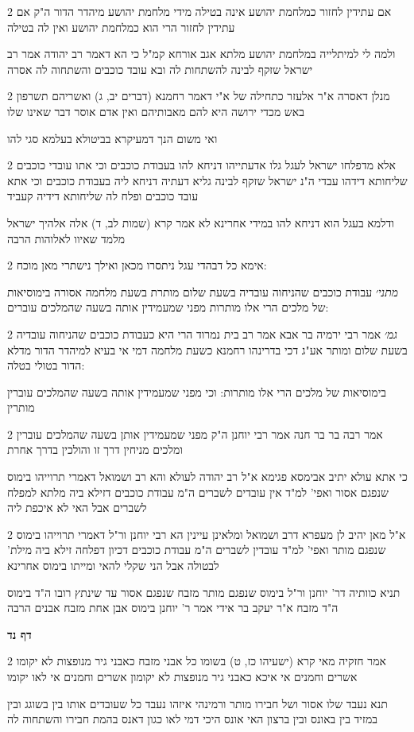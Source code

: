 \documentclass[12pt, openany]{book}
\newcommand{\sethebfont}{
\fontsize{10.5pt}{21.0pt} \selectfont
}
\newcommand{\twocol}[1]{
	{\sethebfont \begin{multicols}{2}
			#1
	\end{multicols}}	
}
\newcommand{\sectname}{}
\newcommand{\newsection}[1]{
	\addcontentsline{toc}{section}{#1}
	\renewcommand{\sectname}{#1}	
	\vspace{-\baselineskip}
	\begin{center}
		\textbf{%
\fontsize{16pt}{16pt}\selectfont
			#1}
	\end{center}
	\vspace{-\baselineskip}
	\nopagebreak
}
\begin{document}
\twocol{אם עתידין לחזור כמלחמת יהושע אינה בטילה מידי מלחמת יהושע מיהדר הדור ה"ק אם עתידין לחזור הרי הוא כמלחמת יהושע ואין לה בטילה
\par ולמה לי למיתלייה במלחמת יהושע מלתא אגב אורחא קמ"ל כי הא דאמר רב יהודה אמר רב ישראל שזקף לבינה להשתחות לה ובא עובד כוכבים והשתחוה לה אסרה}
\twocol{מנלן דאסרה א"ר אלעזר כתחילה של א"י דאמר רחמנא (דברים יב, ג) ואשריהם תשרפון באש מכדי ירושה היא להם מאבותיהם ואין אדם אוסר דבר שאינו שלו
\par ואי משום הנך דמעיקרא בביטולא בעלמא סגי להו}
\twocol{אלא מדפלחו ישראל לעגל גלו אדעתייהו דניחא להו בעבודת כוכבים וכי אתו עובדי כוכבים שליחותא דידהו עבדי ה"נ ישראל שזקף לבינה גליא דעתיה דניחא ליה בעבודת כוכבים וכי אתא עובד כוכבים ופלח לה שליחותא דידיה קעביד
\par ודלמא בעגל הוא דניחא להו במידי אחרינא לא אמר קרא (שמות לב, ד) אלה אלהיך ישראל מלמד שאיוו לאלוהות הרבה}
\twocol{אימא כל דבהדי עגל ניתסרו מכאן ואילך נישתרי מאן מוכח:
\par {\large\emph{מתני׳}} עבודת כוכבים שהניחוה עובדיה בשעת שלום מותרת בשעת מלחמה אסורה בימוסיאות של מלכים הרי אלו מותרות מפני שמעמידין אותה בשעה שהמלכים עוברים:}
\twocol{{\large\emph{גמ׳}} אמר רבי ירמיה בר אבא אמר רב בית נמרוד הרי היא כעבודת כוכבים שהניחוה עובדיה בשעת שלום ומותר אע"ג דכי בדרינהו רחמנא כשעת מלחמה דמי אי בעיא למיהדר הדור מדלא הדור בטולי בטלה:
\par בימוסיאות של מלכים הרי אלו מותרות: וכי מפני שמעמידין אותה בשעה שהמלכים עוברין מותרין}
\twocol{אמר רבה בר בר חנה אמר רבי יוחנן ה"ק מפני שמעמידין אותן בשעה שהמלכים עוברין ומלכים מניחין דרך זו והולכין בדרך אחרת
\par כי אתא עולא יתיב אבימסא פגימא א"ל רב יהודה לעולא והא רב ושמואל דאמרי תרוייהו בימוס שנפגם אסור ואפי' למ"ד אין עובדים לשברים ה"מ עבודת כוכבים דזילא ביה מלתא למפלח לשברים אבל האי לא איכפת ליה}
\twocol{א"ל מאן יהיב לן מעפרא דרב ושמואל ומלאינן עיינין הא רבי יוחנן ור"ל דאמרי תרוייהו בימוס שנפגם מותר ואפי' למ"ד עובדין לשברים ה"מ עבודת כוכבים דכיון דפלחה זילא ביה מילת' לבטולה אבל הני שקלי להאי ומייתו בימוס אחרינא
\par תניא כוותיה דר' יוחנן ור"ל בימוס שנפגם מותר מזבח שנפגם אסור עד שינתץ רובו ה"ד בימוס ה"ד מזבח א"ר יעקב בר אידי אמר ר' יוחנן בימוס אבן אחת מזבח אבנים הרבה}
\newsection{דף נד}
\twocol{אמר חזקיה מאי קרא (ישעיהו כז, ט) בשומו כל אבני מזבח כאבני גיר מנופצות לא יקומו אשרים וחמנים אי איכא כאבני גיר מנופצות לא יקומון אשרים וחמנים אי לאו יקומו
\par תנא נעבד שלו אסור ושל חבירו מותר ורמינהי איזהו נעבד כל שעובדים אותו בין בשוגג ובין במזיד בין באונס ובין ברצון האי אונס היכי דמי לאו כגון דאנס בהמת חבירו והשתחוה לה}
\end{document}
